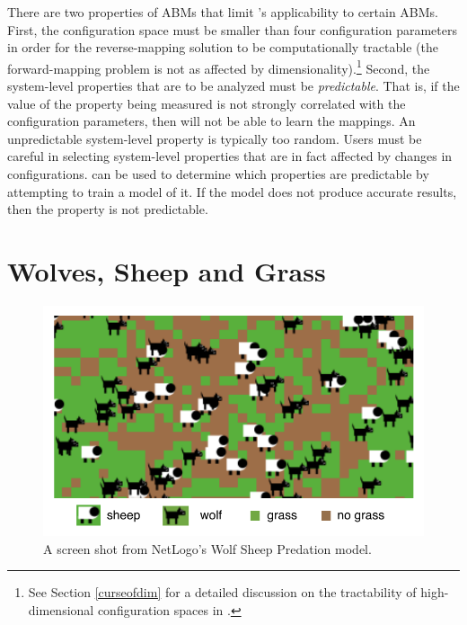There are two properties of ABMs that limit \fw's applicability to certain ABMs.
First, the configuration space must be smaller than four configuration parameters in order for the reverse-mapping solution to be computationally tractable (the forward-mapping problem is not as affected by dimensionality).\footnote{See Section \ref{curseofdim} for a detailed discussion on the tractability of high-dimensional configuration spaces in \fw.}
Second, the system-level properties that are to be analyzed must be \textit{predictable}.
That is, if the value of the property being measured is not strongly correlated with the configuration parameters, then \fw will not be able to learn the mappings.
An unpredictable system-level property is typically too random.
Users must be careful in selecting system-level properties that are in fact affected by changes in configurations.
\fw can be used to determine which properties are predictable by attempting to train a model of it.
If the model does not produce accurate results, then the property is not predictable.

\section{Wolves, Sheep and Grass}

\begin{figure}[ht]
\centering
\includegraphics{images/intro_wolfsheep.pdf}
\caption{A screen shot from NetLogo's Wolf Sheep Predation model.}
\label{fig:wolfsheep}
\end{figure}





